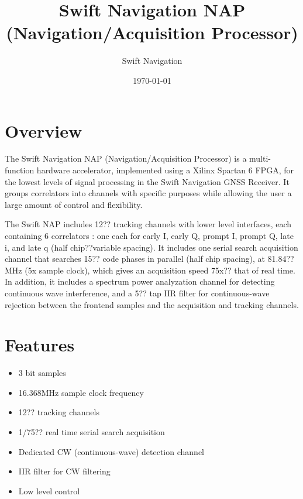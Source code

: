 \documentclass{article}
\title{Swift Navigation NAP\\(Navigation/Acquisition Processor)}
\author{Swift Navigation}
\date{\today}
\begin{document}
\maketitle

\raggedcolumns
\begin{multicols}{2}

\section*{Overview}

The Swift Navigation NAP (Navigation/Acquisition Processor) is a multi-function 
hardware accelerator, implemented using a Xilinx Spartan 6 FPGA, for the lowest levels 
of signal processing in the Swift Navigation GNSS Receiver. It groups correlators into 
channels with specific purposes while allowing the user a large amount of control and 
flexibility.

The Swift NAP includes 12?? tracking channels with lower level interfaces, each containing 
6 correlators : one each for early I, early Q, prompt I, prompt Q, late i, and late q (half 
chip??variable spacing). It includes one serial search acquisition channel that searches 15?? 
code phases in parallel (half chip spacing), at 81.84?? MHz (5x sample clock), which gives 
an acquisition speed 75x?? that of real time. In addition, it includes a spectrum power 
analyzation channel for detecting continuous wave interference, and a 5?? tap IIR filter for 
continuous-wave rejection between the frontend samples and the acquisition and tracking channels.
\columnbreak

\section*{Features}
\begin{itemize}
  \bulletnoindent
  \item 3 bit samples
  \item 16.368MHz sample clock frequency
  \item 12?? tracking channels
  \item 1/75?? real time serial search acquisition
  \item Dedicated CW (continuous-wave) detection channel
  \item IIR filter for CW filtering
  \item Low level control
\end{itemize}

\pagebreak
\tableofcontents
\pagebreak

\end{multicols}
\end{document}
